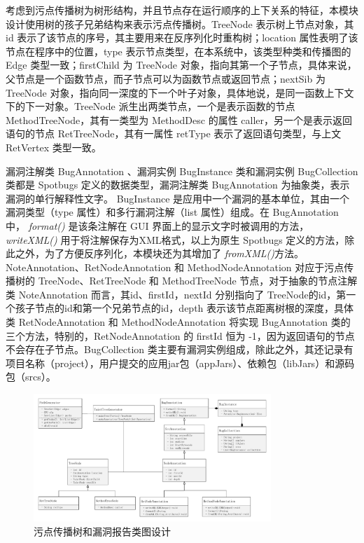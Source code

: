 考虑到污点传播树为树形结构，并且节点存在运行顺序的上下关系的特征，本模块设计使用树的孩子兄弟结构来表示污点传播树。TreeNode 表示树上节点对象，其 id 表示了该节点的序号，其主要用来在反序列化时重构树；location 属性表明了该节点在程序中的位置，type 表示节点类型，在本系统中，该类型种类和传播图的 Edge 类型一致；firstChild 为 TreeNode 对象，指向其第一个子节点，具体来说，父节点是一个函数节点，而子节点可以为函数节点或返回节点；nextSib 为 TreeNode 对象，指向同一深度的下一个叶子对象，具体地说，是同一函数上下文下的下一对象。TreeNode 派生出两类节点，一个是表示函数的节点 MethodTreeNode，其有一类型为 MethodDesc 的属性 caller，另一个是表示返回语句的节点 RetTreeNode，其有一属性 retType 表示了返回语句类型，与上文 RetVertex 类型一致。

漏洞注解类 BugAnnotation 、漏洞实例 BugInstance 类和漏洞实例 BugCollection 类都是 Spotbugs 定义的数据类型，漏洞注解类 BugAnnotation 为抽象类，表示漏洞的单行解释性文字。
BugInstance 是应用中一个漏洞的基本单位，其由一个漏洞类型（type 属性）和多行漏洞注解（list 属性）组成。在 BugAnnotation 中， \textit{format()} 是该条注解在 GUI 界面上的显示文字时被调用的方法，\textit{writeXML()} 用于将注解保存为XML格式，以上为原生 Spotbugs 定义的方法，除此之外，为了方便反序列化，本模块还为其增加了 \textit{fromXML()}方法。NoteAnnotation、RetNodeAnnotation 和 MethodNodeAnnotation 对应于污点传播树的 TreeNode、RetTreeNode 和 MethodTreeNode 节点，对于抽象的节点注解类 NoteAnnotation 而言，其id、firstId，nextId 分别指向了 TreeNode的id，第一个孩子节点的id和第一个兄弟节点的id，depth 表示该节点距离树根的深度，具体类 RetNodeAnnotation 和 MethodNodeAnnotation 将实现 BugAnnotation 类的三个方法，特别的，RetNodeAnnotation 的 firstId 恒为 -1，因为返回语句的节点不会存在子节点。BugCollection 类主要有漏洞实例组成，除此之外，其还记录有项目名称（project），用户提交的应用jar包（appJars）、依赖包（libJars）和源码包（srcs）。

\begin{figure}[!htb]
	\centering
	\includegraphics[width=0.8\textwidth]{FIGs/chapter3/taintTreeAnnotationClass.pdf}
	\caption{污点传播树和漏洞报告类图设计}\label{taintTreeAnnotationClass}
\end{figure}

